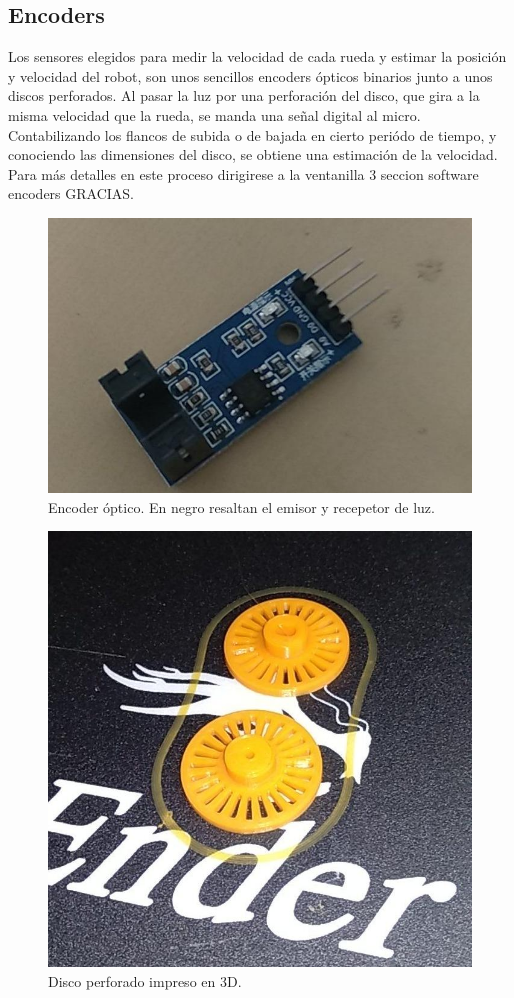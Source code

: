 \subsection{Encoders}\label{enc_hard}
Los sensores elegidos para medir la velocidad de cada rueda y estimar la posición y velocidad del robot, son unos sencillos encoders ópticos binarios junto a unos discos perforados. Al pasar la luz por una perforación del disco, que gira a la misma velocidad que la rueda, se manda una señal digital al micro. Contabilizando los flancos de subida o de bajada en cierto periódo de tiempo, y conociendo las dimensiones del disco, se obtiene una estimación de la velocidad. Para más detalles en este proceso dirigirese a la ventanilla 3 seccion software encoders GRACIAS. 
 \begin{figure}[h!]
 	\centering
 	\includegraphics[width=.6\textwidth]{images/hw/encoder_img}
 	\caption{Encoder óptico. En negro resaltan el emisor y recepetor de luz.}
 \end{figure}
  \begin{figure}[h!]
  	\centering
  	\includegraphics[width=.6\textwidth]{images/hw/encoder_stl}
  	\caption{Disco perforado impreso en 3D.}
  \end{figure}
  
